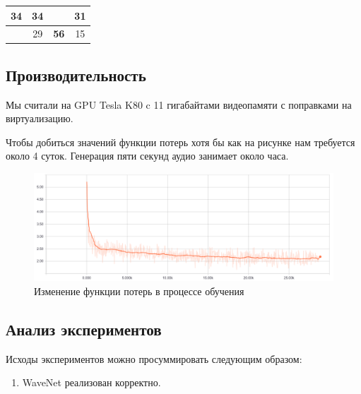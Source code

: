 \documentclass[../diploma.tex]{subfiles}
\begin{document}
\begin{table}[]
\begin{tabular}{|c|c|c|c|}
\textbf{34}                                                               & \textbf{34}                                                                                      &                                                                                                 & 31                                                          \\ \hline
                                                                          & 29                                                                                               & \textbf{56}                                                                                     & 15                                                          \\ \hline
\end{tabular}
\end{table}


\subsection{Производительность}

Мы считали на GPU Tesla K80 c 11 гигабайтами видеопамяти с поправками на виртуализацию.

Чтобы добиться значений функции потерь хотя бы как на рисунке \label{fig:perf} нам требуется около 4 суток. Генерация пяти секунд аудио занимает около часа.

\begin{figure}[h!]
  \includegraphics[scale=0.36]{img/perf}
  \caption{Изменение функции потерь в процессе обучения}
  \label{fig:perf}
\end{figure}

\subsection{Анализ экспериментов}

Исходы экспериментов можно просуммировать следующим образом:

\begin{enumerate}[resume]
    \item WaveNet реализован корректно.
\end{enumerate}
\end{document}
